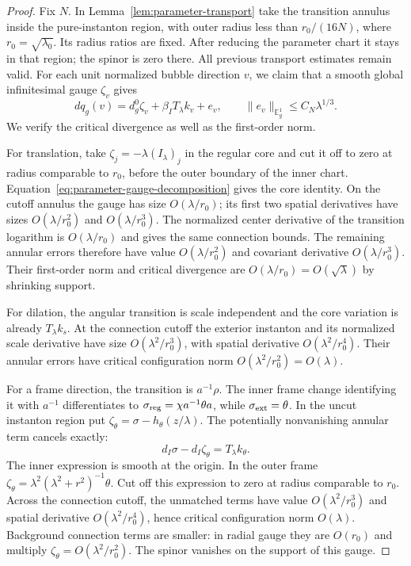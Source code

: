 \documentclass[11pt]{amsart}
\theoremstyle{definition}
\theoremstyle{remark}
\theoremstyle{plain}
\begin{document}
\begin{proof}
Fix $N$.  In Lemma~\ref{lem:parameter-transport} take the transition
annulus inside the pure-instanton region, with outer radius less than
$r_0/(16N)$, where $r_0=\sqrt{\lambda_0}$.  Its radius ratios are
fixed.  After reducing the parameter chart it stays in that region;
the spinor is zero there.  All previous transport estimates remain valid.
For each unit normalized bubble direction $v$, we claim that a smooth
global infinitesimal gauge $\zeta_v$ gives
\begin{equation}\label{eq:pregluing-mode-comparison}
 dq_g(v)=d_g^0\zeta_v+\beta_IT_\lambda k_v+e_v,
 \qquad \|e_v\|_{\mathbb E_g^1}\leq C_N\lambda^{1/3}.
\end{equation}
We verify the critical divergence as well as the first-order norm.

For translation, take $\zeta_j=-\lambda(I_\lambda)_j$ in the
regular core and cut it off to zero at radius comparable to $r_0$,
before the outer boundary of the inner chart.
Equation~\eqref{eq:parameter-gauge-decomposition} gives the core identity.
On the cutoff annulus the gauge has size $O(\lambda/r_0)$; its first
two spatial derivatives have sizes $O(\lambda/r_0^2)$ and
$O(\lambda/r_0^3)$.  The normalized center derivative of the transition
logarithm is $O(\lambda/r_0)$ and gives the same connection bounds.
The remaining annular errors therefore have value
$O(\lambda/r_0^2)$ and covariant derivative
$O(\lambda/r_0^3)$.  Their first-order norm and critical divergence
are $O(\lambda/r_0)=O(\sqrt\lambda)$ by shrinking support.

For dilation, the angular transition is scale independent and the core
variation is already $T_\lambda k_s$.  At the connection cutoff the
exterior instanton and its normalized scale derivative have size
$O(\lambda^2/r_0^3)$, with spatial derivative
$O(\lambda^2/r_0^4)$.  Their annular errors have critical configuration
norm $O(\lambda^2/r_0^2)=O(\lambda)$.

For a frame direction, the transition is $a^{-1}\rho$.
The inner frame change identifying it with $a^{-1}$ differentiates to
$\sigma_{\rm reg}=\chi a^{-1}\theta a$, while
$\sigma_{\rm ext}=\theta$.  In the uncut instanton region put
$\zeta_\theta=\sigma-h_\theta(z/\lambda)$.
The potentially nonvanishing annular term cancels exactly:
\[
 d_I\sigma-d_I\zeta_\theta=T_\lambda k_\theta.
\]
The inner expression is smooth at the origin.  In the outer frame
$\zeta_\theta=\lambda^2(\lambda^2+r^2)^{-1}\theta$.
Cut off this expression to zero at radius comparable to $r_0$.
Across the connection cutoff, the unmatched terms have value
$O(\lambda^2/r_0^3)$ and spatial derivative
$O(\lambda^2/r_0^4)$, hence critical configuration norm $O(\lambda)$.
Background connection terms are smaller: in radial gauge they are
$O(r_0)$ and multiply $\zeta_\theta=O(\lambda^2/r_0^2)$.
The spinor vanishes on the support of this gauge.


\end{proof}
\end{document}
